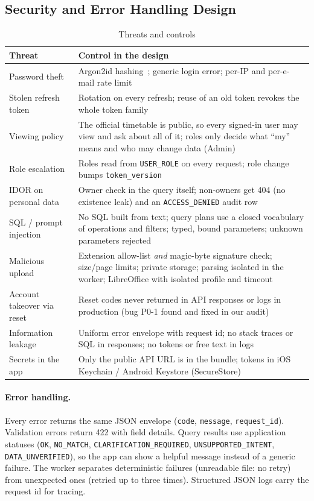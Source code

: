 \subsection{Security and Error Handling Design}
\begin{table}[H]
\centering
\caption{Threats and controls}
\label{tab:security}
\small
\begin{tabularx}{\textwidth}{@{}p{3.6cm}X@{}}
\toprule
\textbf{Threat} & \textbf{Control in the design}\\
\midrule
Password theft & Argon2id hashing~\cite{biryukov2016}; generic login error; per-IP and per-e-mail rate limit\\
Stolen refresh token & Rotation on every refresh; reuse of an old token revokes the whole token family\\
Viewing policy & The official timetable is public, so every signed-in user may view and ask about all of it; roles only decide what ``my'' means and who may change data (Admin)\\
Role escalation & Roles read from \texttt{USER\_ROLE} on every request; role change bumps \texttt{token\_version}\\
IDOR on personal data & Owner check in the query itself; non-owners get 404 (no existence leak) and an \texttt{ACCESS\_DENIED} audit row\\
SQL / prompt injection & No SQL built from text; query plans use a closed vocabulary of operations and filters; typed, bound parameters; unknown parameters rejected\\
Malicious upload & Extension allow-list \emph{and} magic-byte signature check; size/page limits; private storage; parsing isolated in the worker; LibreOffice with isolated profile and timeout\\
Account takeover via reset & Reset codes never returned in API responses or logs in production (bug P0-1 found and fixed in our audit)\\
Information leakage & Uniform error envelope with request id; no stack traces or SQL in responses; no tokens or free text in logs\\
Secrets in the app & Only the public API URL is in the bundle; tokens in iOS Keychain / Android Keystore (SecureStore)\\
\bottomrule
\end{tabularx}
\end{table}
\paragraph{Error handling.}
Every error returns the same JSON envelope (\texttt{code}, \texttt{message}, \texttt{request\_id}).
Validation errors return 422 with field details. Query results use application statuses
(\texttt{OK}, \texttt{NO\_MATCH}, \texttt{CLARIFICATION\_REQUIRED}, \texttt{UNSUPPORTED\_INTENT},
\texttt{DATA\_UNVERIFIED}), so the app can show a helpful message instead of a generic failure. The
worker separates deterministic failures (unreadable file: no retry) from unexpected ones (retried up
to three times). Structured JSON logs carry the request id for tracing.

\newpage
